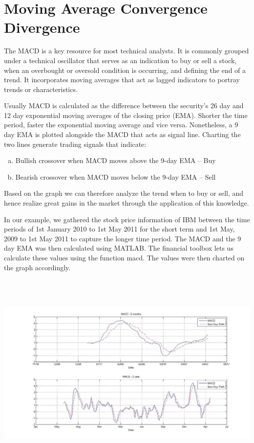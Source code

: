 \documentclass[12pt]{article}
\begin{document}
\section{Moving Average Convergence Divergence}
\hspace{6 mm}The MACD is a key resource for most technical analysts. It is commonly grouped under a technical oscillator that serves as an indication to buy or sell a stock, when an overbought or oversold condition is occurring, and defining the end of a trend. It incorporates moving averages that act as lagged indicators to portray trends or characteristics.

Usually MACD is calculated as the difference between the security’s 26 day and 12 day exponential moving averages of the closing price (EMA). Shorter the time period, faster the exponential moving average and vice versa. Nonetheless, a 9 day EMA is plotted alongside the MACD that acts as signal line. Charting the two lines generate trading signals that indicate:
\begin{enumerate}[(a)] 
\item Bullish crossover when MACD moves above the 9-day EMA – Buy
\item Bearish crossover when MACD moves below the 9-day EMA – Sell 
\end{enumerate}
Based on the graph we can therefore analyze the trend when to buy or sell, and hence realize great gains in the market through the application of this knowledge.

In our example, we gathered the stock price information of IBM between the time periods of 1st January 2010 to 1st May 2011 for the short term and 1st May, 2009 to 1st May 2011 to capture the longer time period. The MACD and the 9 day EMA was then calculated using MATLAB. The financial toolbox lets us calculate these values using the function macd. The values were then charted on the graph accordingly. 

\includegraphics[height=4in,width=5.5in]{MACD.jpg}
\end{document}
